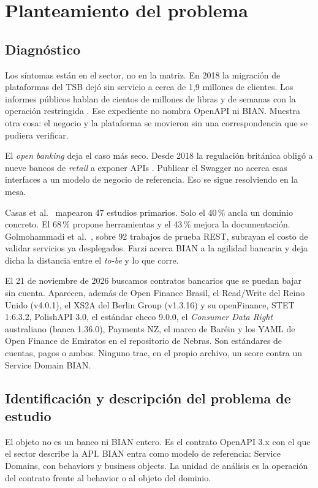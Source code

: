 \chapter{Planteamiento del problema}

\section{Diagnóstico}

Los síntomas están en el sector, no en la matriz. En 2018 la migración de plataformas del TSB dejó sin servicio a cerca de 1,9 millones de clientes. Los informes públicos hablan de cientos de millones de libras y de semanas con la operación restringida \cite{UKTreasuryTSB2018}. Ese expediente no nombra OpenAPI ni BIAN. Muestra otra cosa: el negocio y la plataforma se movieron sin una correspondencia que se pudiera verificar.

El \textit{open banking} deja el caso más seco. Desde 2018 la regulación británica obligó a nueve bancos de \textit{retail} a exponer APIs \cite{CMA2016}. Publicar el Swagger no acerca esas interfaces a un modelo de negocio de referencia. Eso se sigue resolviendo en la mesa.

Casas et al.\ \cite{Casas2021} mapearon 47 estudios primarios. Solo el 40\,\% ancla un dominio concreto. El 68\,\% propone herramientas y el 43\,\% mejora la documentación. Golmohammadi et al.\ \cite{Golmohammadi2024}, sobre 92 trabajos de prueba REST, subrayan el costo de validar servicios ya desplegados. Farzi \cite{Farzi2021} acerca BIAN a la agilidad bancaria y deja dicha la distancia entre el \textit{to-be} y lo que corre.

El 21 de noviembre de 2026 buscamos contratos bancarios que se puedan bajar sin cuenta. Aparecen, además de Open Finance Brasil, el Read/Write del Reino Unido (v4.0.1), el XS2A del Berlin Group (v1.3.16) y su openFinance, STET 1.6.3.2, PolishAPI 3.0, el estándar checo 9.0.0, el \textit{Consumer Data Right} australiano (banca 1.36.0), Payments NZ, el marco de Baréin y los YAML de Open Finance de Emiratos en el repositorio de Nebras. Son estándares de cuentas, pagos o ambos. Ninguno trae, en el propio archivo, un score contra un Service Domain BIAN.

\section{Identificación y descripción del problema de estudio}

El objeto no es un banco ni BIAN entero. Es el contrato OpenAPI 3.x con el que el sector describe la API. BIAN entra como modelo de referencia: Service Domains, con behaviors y business objects. La unidad de análisis es la operación del contrato frente al behavior o al objeto del dominio.

